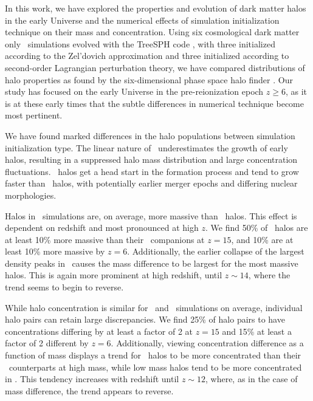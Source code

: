 
%
%
%
%


In this work, we have explored the properties and evolution of dark matter halos in the early Universe and the numerical effects of simulation initialization technique on their mass and concentration.  Using six cosmological dark matter only \nbody\ simulations evolved with the TreeSPH code \gadgettwo, with three initialized according to the Zel'dovich approximation and three initialized according to second-order Lagrangian perturbation theory, we have compared distributions of halo properties as found by the six-dimensional phase space halo finder \rockstar.  Our study has focused on the early Universe in the pre-reionization epoch $z \ge 6$, as it is at these early times that the subtle differences in numerical technique become most pertinent.

We have found marked differences in the halo populations between simulation initialization type.  The linear nature of \za\ underestimates the growth of early halos, resulting in a suppressed halo mass distribution and large concentration fluctuations.  \lpt\ halos get a head start in the formation process and tend to grow faster than \za\ halos, with potentially earlier merger epochs and differing nuclear morphologies.

Halos in \lpt\ simulations are, on average, more massive than \za\ halos.  This effect is dependent on redshift and most pronounced at high $z$.  We find 50\% of \lpt\ halos are at least 10\% more massive than their \za\ companions at $z = 15$, and 10\% are at least 10\% more massive by $z = 6$.  Additionally, the earlier collapse of the largest density peaks in \lpt\ causes the mass difference to be largest for the most massive halos.  This is again more prominent at high redshift, until $z \sim 14$, where the trend seems to begin to reverse.

While halo concentration is similar for \za\ and \lpt\ simulations on average, individual halo pairs can retain large discrepancies.  We find 25\% of halo pairs to have concentrations differing by at least a factor of 2 at $z = 15$ and 15\% at least a factor of 2 different by $z = 6$.  Additionally, viewing concentration difference as a function of mass displays a trend for \za\ halos to be more concentrated than their \lpt\ counterparts at high mass, while low mass halos tend to be more concentrated in \lpt.  This tendency increases with redshift until $z \sim 12$, where, as in the case of mass difference, the trend appears to reverse.


